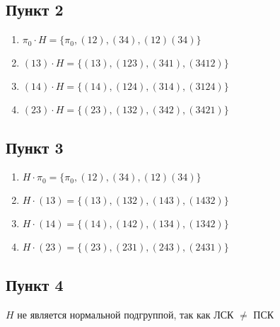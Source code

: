 \documentclass{article}
\begin{document}
\subsection*{Пункт 2}
\begin{enumerate}
    \item $\pi_0 \cdot H = \{\pi_0, (12) , (34) , (12)(34)\}$
    \item $(13)  \cdot H = \{(13) , (123), (341), (3412)  \}$
    \item $(14)  \cdot H = \{(14) , (124), (314), (3124)  \}$
    \item $(23)  \cdot H = \{(23) , (132), (342), (3421)  \}$
\end{enumerate}

\subsection*{Пункт 3}
\begin{enumerate}
    \item $H \cdot \pi_0 = \{\pi_0, (12) , (34) , (12)(34)\}$
    \item $H \cdot (13)  = \{(13) , (132), (143), (1432)  \}$
    \item $H \cdot (14)  = \{(14) , (142), (134), (1342)  \}$
    \item $H \cdot (23)  = \{(23) , (231), (243), (2431)  \}$
\end{enumerate}

\subsection*{Пункт 4}
$H$ не является нормальной подгруппой, так как ЛСК $\ne$ ПСК
\end{document}
